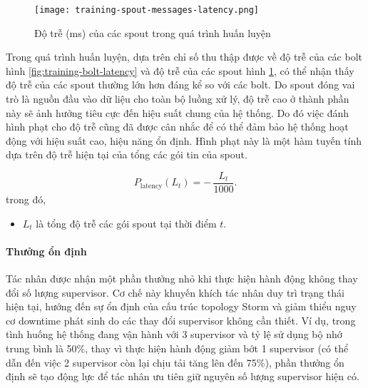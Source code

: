 \begin{figure}
    \centering
    \texttt{[image: training-spout-messages-latency.png]}
    \caption{Độ trễ (ms) của các spout trong quá trình huấn luyện}
    \label{fig:training-spout-latency}
\end{figure}

Trong quá trình huấn luyện, dựa trên chỉ số thu thập được về độ trễ của các bolt hình \ref{fig:training-bolt-latency} và độ trễ của các spout hình \ref{fig:training-spout-latency}, có thể nhận thấy độ trễ của các spout thường lớn hơn đáng kể so với các bolt. Do spout đóng vai trò là nguồn đầu vào dữ liệu cho toàn bộ luồng xử lý, độ trễ cao ở thành phần này sẽ ảnh hưởng tiêu cực đến hiệu suất chung của hệ thống. Do đó việc đánh hình phạt cho độ trễ cũng đã được cân nhắc để có thể đảm bảo hệ thống hoạt động với hiệu suất cao, hiệu năng ổn định. Hình phạt này là một hàm tuyến tính dựa trên độ trễ hiện tại của tổng các gói tin của spout.

\begin{equation}
    P_{\text{latency}}(L_t) = -\,\frac{L_t}{1000}.
\end{equation}
trong đó,
\begin{itemize}
    \item $L_t$ là tổng độ trễ các gói spout tại thời điểm $t$.
\end{itemize}

\paragraph{Thưởng ổn định}

Tác nhân được nhận một phần thưởng nhỏ khi thực hiện hành động không thay đổi số lượng supervisor. Cơ chế này khuyến khích tác nhân duy trì trạng thái hiện tại, hướng đến sự ổn định của cấu trúc topology Storm và giảm thiểu nguy cơ downtime phát sinh do các thay đổi supervisor không cần thiết. Ví dụ, trong tình huống hệ thống đang vận hành với 3 supervisor và tỷ lệ sử dụng bộ nhớ trung bình là 50\%, thay vì thực hiện hành động giảm bớt 1 supervisor (có thể dẫn đến việc 2 supervisor còn lại chịu tải tăng lên đến 75\%), phần thưởng ổn định sẽ tạo động lực để tác nhân ưu tiên giữ nguyên số lượng supervisor hiện có.


